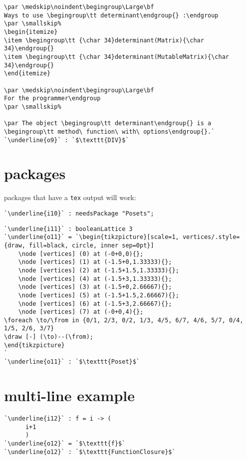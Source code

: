 \documentclass[12pt,a4paper]{amsart}
\begin{document}
\begin{lstlisting}[language=Macaulay2]
\par \medskip\noindent\begingroup\Large\bf
Ways to use \begingroup\tt determinant\endgroup{} :\endgroup
\par \smallskip%
\begin{itemize}
\item \begingroup\tt {\char 34}determinant(Matrix){\char 34}\endgroup{}
\item \begingroup\tt {\char 34}determinant(MutableMatrix){\char 34}\endgroup{}
\end{itemize}

\par \medskip\noindent\begingroup\Large\bf
For the programmer\endgroup
\par \smallskip%

\par The object \begingroup\tt determinant\endgroup{} is a \begingroup\tt method\ function\ with\ options\endgroup{}.`
`\underline{o9}` : `$\texttt{DIV}$`
\end{lstlisting}
\smallskip


\section{packages}
packages that have a {\tt tex} output will work:
\smallskip
\begin{lstlisting}[language=Macaulay2]
`\underline{i10}` : needsPackage "Posets";
\end{lstlisting}
\begin{lstlisting}[language=Macaulay2]
`\underline{i11}` : booleanLattice 3
`\underline{o11}` = `\begin{tikzpicture}[scale=1, vertices/.style={draw, fill=black, circle, inner sep=0pt}]
	\node [vertices] (0) at (-0+0,0){};
	\node [vertices] (1) at (-1.5+0,1.33333){};
	\node [vertices] (2) at (-1.5+1.5,1.33333){};
	\node [vertices] (4) at (-1.5+3,1.33333){};
	\node [vertices] (3) at (-1.5+0,2.66667){};
	\node [vertices] (5) at (-1.5+1.5,2.66667){};
	\node [vertices] (6) at (-1.5+3,2.66667){};
	\node [vertices] (7) at (-0+0,4){};
\foreach \to/\from in {0/1, 2/3, 0/2, 1/3, 4/5, 6/7, 4/6, 5/7, 0/4, 1/5, 2/6, 3/7}
\draw [-] (\to)--(\from);
\end{tikzpicture}
`
`\underline{o11}` : `$\texttt{Poset}$`
\end{lstlisting}
\smallskip


\section{multi-line example}
\smallskip
\begin{lstlisting}[language=Macaulay2]
`\underline{i12}` : f = i -> (
      i+1
      )
`\underline{o12}` = `$\texttt{f}$`
`\underline{o12}` : `$\texttt{FunctionClosure}$`
\end{lstlisting}
\smallskip
\end{document}
